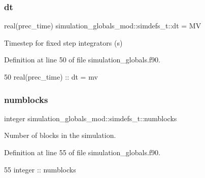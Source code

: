 \subsubsection{\texorpdfstring{dt}{dt}}
{\footnotesize\ttfamily real(prec\+\_\+time) simulation\+\_\+globals\+\_\+mod\+::simdefs\+\_\+t\+::dt = MV\hspace{0.3cm}{\ttfamily [private]}}



Timestep for fixed step integrators (s) 



Definition at line 50 of file simulation\+\_\+globals.\+f90.


\begin{DoxyCode}
50         \textcolor{keywordtype}{real(prec\_time)} ::  dt = mv         
\end{DoxyCode}
\mbox{\label{structsimulation__globals__mod_1_1simdefs__t_a6b7497df8a36fe045f2096963db3bdde}} 
\subsubsection{\texorpdfstring{numblocks}{numblocks}}
{\footnotesize\ttfamily integer simulation\+\_\+globals\+\_\+mod\+::simdefs\+\_\+t\+::numblocks\hspace{0.3cm}{\ttfamily [private]}}



Number of blocks in the simulation. 



Definition at line 55 of file simulation\+\_\+globals.\+f90.


\begin{DoxyCode}
55         \textcolor{keywordtype}{integer}         ::  numblocks
\end{DoxyCode}
\mbox{\label{structsimulation__globals__mod_1_1simdefs__t_a0437ce61f2882028c5e3ca0212aeaf24}} 
